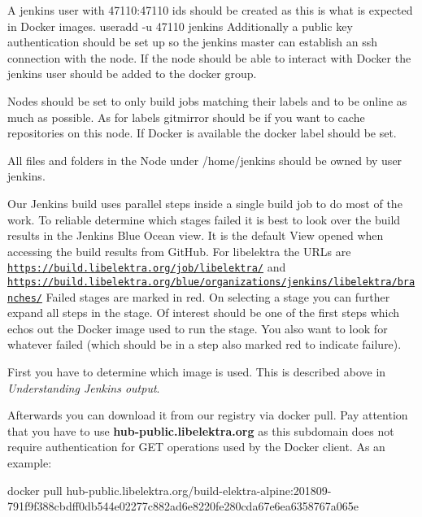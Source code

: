 A {\ttfamily jenkins} user with 47110\+:47110 ids should be created as this is what is expected in Docker images. {\ttfamily useradd -\/u 47110 jenkins} Additionally a public key authentication should be set up so the jenkins master can establish an ssh connection with the node. If the node should be able to interact with Docker the jenkins user should be added to the {\ttfamily docker} group.

Nodes should be set to only build jobs matching their labels and to be online as much as possible. As for labels {\ttfamily gitmirror} should be if you want to cache repositories on this node. If Docker is available the {\ttfamily docker} label should be set.

All files and folders in the Node under {\ttfamily /home/jenkins} should be owned by user {\ttfamily jenkins}.

Our Jenkins build uses parallel steps inside a single build job to do most of the work. To reliable determine which stages failed it is best to look over the build results in the Jenkins Blue Ocean view. It is the default View opened when accessing the build results from Git\+Hub. For libelektra the U\+R\+Ls are \href{https://build.libelektra.org/job/libelektra/}{\tt https\+://build.\+libelektra.\+org/job/libelektra/} and \href{https://build.libelektra.org/blue/organizations/jenkins/libelektra/branches/}{\tt https\+://build.\+libelektra.\+org/blue/organizations/jenkins/libelektra/branches/} Failed stages are marked in red. On selecting a stage you can further expand all steps in the stage. Of interest should be one of the first steps which echos out the Docker image used to run the stage. You also want to look for whatever failed (which should be in a step also marked red to indicate failure).

First you have to determine which image is used. This is described above in {\itshape Understanding Jenkins output}.

Afterwards you can download it from our registry via {\ttfamily docker pull}. Pay attention that you have to use {\bfseries hub-\/public.\+libelektra.\+org} as this subdomain does not require authentication for G\+ET operations used by the Docker client. As an example\+:


\begin{DoxyCode}
docker pull
       hub-public.libelektra.org/build-elektra-alpine:201809-791f9f388cbdff0db544e02277c882ad6e8220fe280cda67e6ea6358767a065e
\end{DoxyCode}


